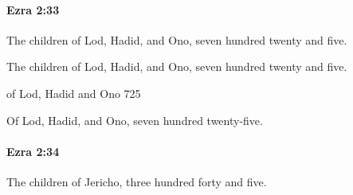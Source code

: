 		\paragraph{Ezra 2:33} %
			\label{EZRA-2-33}

			The children of Lod, Hadid, and Ono, seven hundred twenty and five.

			\begin{versebox}
					\item[BHS] 
					\item[LXX] 
					\item[ASV] The children of Lod, Hadid, and Ono, seven hundred twenty and five.
					\item[NIV] of Lod, Hadid and Ono 725
					\item[NRSV] Of Lod, Hadid, and Ono, seven hundred twenty-five.
			\end{versebox}

		\paragraph{Ezra 2:34} %
			\label{EZRA-2-34}

			The children of Jericho, three hundred forty and five.

